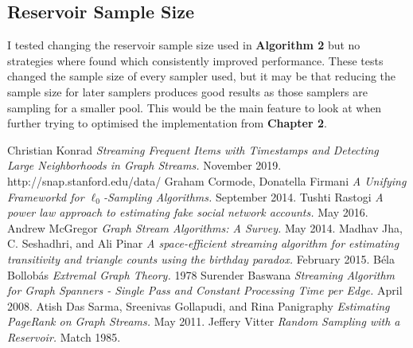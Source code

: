 \documentclass[11pt,twoside,a4paper]{report}
\begin{document}
\subsection*{Reservoir Sample Size}
I tested changing the reservoir sample size used in \textbf{Algorithm 2} but no strategies where found which consistently improved performance. These tests changed the sample size of every sampler used, but it may be that reducing the sample size for later samplers produces good results as those samplers are sampling for a smaller pool. This would be the main feature to look at when further trying to optimised the implementation from \textbf{Chapter 2}.

\begin{thebibliography}{4}
	 Christian Konrad \textit{Streaming Frequent Items with Timestamps and Detecting Large Neighborhoods in Graph Streams.} November 2019.
	http://snap.stanford.edu/data/
	 Graham Cormode, Donatella Firmani \textit{A Unifying Frameworkd for $\ell_0$-Sampling Algorithms.} September 2014.
   Tushti Rastogi \textit{A power law approach to estimating fake social network accounts.} May 2016.
   Andrew McGregor \textit{Graph Stream Algorithms: A Survey.} May 2014.
   Madhav Jha, C. Seshadhri, and Ali Pinar \textit{A space-efficient streaming algorithm for estimating transitivity and triangle counts using the birthday paradox.} February 2015.
   B\'ela Bollob\'as \textit{Extremal Graph Theory.} 1978
   Surender Baswana \textit{Streaming Algorithm for Graph Spanners - Single Pass and Constant Processing Time per Edge.} April 2008.
   Atish Das Sarma, Sreenivas Gollapudi, and Rina Panigraphy \textit{Estimating PageRank on Graph Streams.} May 2011.
   Jeffery Vitter \textit{Random Sampling with a Reservoir.} Match 1985.
\end{thebibliography}
\end{document}
